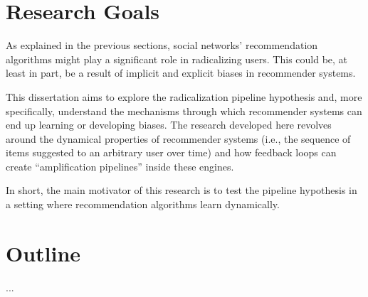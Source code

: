 \section{Research Goals}
\label{sec:research_goals}

As explained in the previous sections, social networks' recommendation
algorithms might play a significant role in radicalizing users. This could be,
at least in part, be a result of implicit and explicit biases in recommender
systems.

This dissertation aims to explore the radicalization pipeline hypothesis and,
more specifically, understand the mechanisms through which recommender systems
can end up learning or developing biases. The research developed here revolves
around the dynamical properties of recommender systems (i.e., the sequence of
items suggested to an arbitrary user over time) and how feedback loops can
create ``amplification pipelines'' inside these engines.

In short, the main motivator of this research is to test the pipeline hypothesis
in a setting where recommendation algorithms learn dynamically.

\section{Outline}
\label{sec:outline}

...
